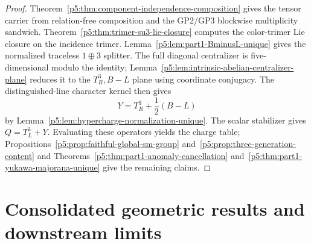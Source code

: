\documentclass[12pt,a4paper]{article}
\begin{document}
\begin{proof}
Theorem~\ref{p5:thm:component-independence-composition} gives the tensor
carrier from relation-free composition and the GP2/GP3 blockwise multiplicity
sandwich.
Theorem~\ref{p5:thm:trimer-su3-lie-closure} computes the color-trimer Lie
closure on the incidence trimer.  Lemma~\ref{p5:lem:part1-BminusL-unique}
gives the normalized traceless \(1\oplus3\) splitter.  The full diagonal
centralizer is five-dimensional modulo the identity;
Lemma~\ref{p5:lem:intrinsic-abelian-centralizer-plane} reduces it to the
\(T_R^3,B-L\) plane using coordinate conjugacy.  The distinguished-line
character kernel then gives
\[
Y=T_R^3+\frac12(B-L)
\]
by Lemma~\ref{p5:lem:hypercharge-normalization-unique}.  The scalar stabilizer
gives \(Q=T_L^3+Y\).  Evaluating these operators yields the charge table;
Propositions~\ref{p5:prop:faithful-global-sm-group}
and~\ref{p5:prop:three-generation-content} and
Theorems~\ref{p5:thm:part1-anomaly-cancellation}
and~\ref{p5:thm:part1-yukawa-majorana-unique} give the remaining claims.
\end{proof}



\section{Consolidated geometric results and downstream limits}
\label{p5a:sec:organized-results}
\end{document}
